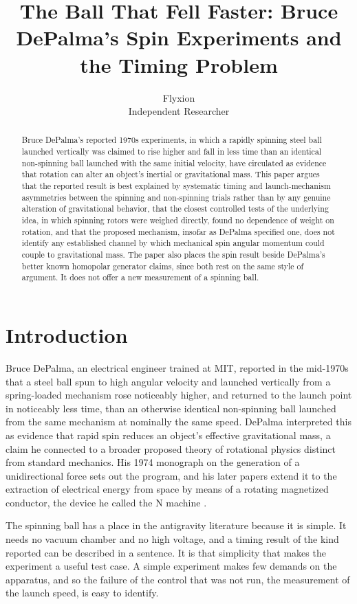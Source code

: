\documentclass[11pt]{article}
\title{The Ball That Fell Faster: Bruce DePalma's Spin Experiments and the Timing Problem}
\author{Flyxion \\ \small Independent Researcher}
\date{}
\begin{document}
\maketitle

\begin{abstract}
Bruce DePalma's reported 1970s experiments, in which a rapidly spinning steel ball launched vertically was claimed to rise higher and fall in less time than an identical non-spinning ball launched with the same initial velocity, have circulated as evidence that rotation can alter an object's inertial or gravitational mass. This paper argues that the reported result is best explained by systematic timing and launch-mechanism asymmetries between the spinning and non-spinning trials rather than by any genuine alteration of gravitational behavior, that the closest controlled tests of the underlying idea, in which spinning rotors were weighed directly, found no dependence of weight on rotation, and that the proposed mechanism, insofar as DePalma specified one, does not identify any established channel by which mechanical spin angular momentum could couple to gravitational mass. The paper also places the spin result beside DePalma's better known homopolar generator claims, since both rest on the same style of argument. It does not offer a new measurement of a spinning ball.
\end{abstract}

\section{Introduction}

Bruce DePalma, an electrical engineer trained at MIT, reported in the mid-1970s that a steel ball spun to high angular velocity and launched vertically from a spring-loaded mechanism rose noticeably higher, and returned to the launch point in noticeably less time, than an otherwise identical non-spinning ball launched from the same mechanism at nominally the same speed. DePalma interpreted this as evidence that rapid spin reduces an object's effective gravitational mass, a claim he connected to a broader proposed theory of rotational physics distinct from standard mechanics. His 1974 monograph on the generation of a unidirectional force sets out the program, and his later papers extend it to the extraction of electrical energy from space by means of a rotating magnetized conductor, the device he called the N machine \cite{DP1974,DP1990}.

The spinning ball has a place in the antigravity literature because it is simple. It needs no vacuum chamber and no high voltage, and a timing result of the kind reported can be described in a sentence. It is that simplicity that makes the experiment a useful test case. A simple experiment makes few demands on the apparatus, and so the failure of the control that was not run, the measurement of the launch speed, is easy to identify.
\end{document}

